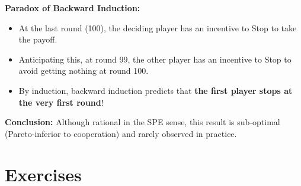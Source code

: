 \textbf{Paradox of Backward Induction:}
\begin{itemize}
    \item At the last round (100), the deciding player has an incentive to Stop to take the payoff.
    \item Anticipating this, at round 99, the other player has an incentive to Stop to avoid getting nothing at round 100.
    \item By induction, backward induction predicts that \textbf{the first player stops at the very first round}!
\end{itemize}
\textbf{Conclusion:} Although rational in the SPE sense, this result is sub-optimal (Pareto-inferior to cooperation) and rarely observed in practice.

\section{Exercises}
